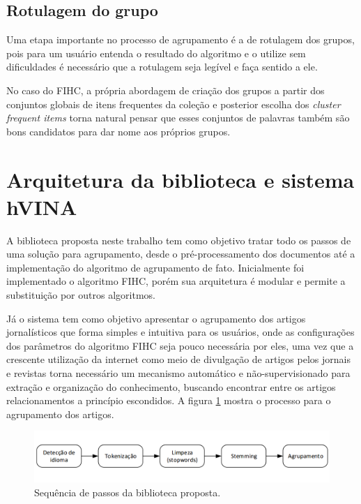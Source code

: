 \documentclass[a4paper,12pt]{article}
\begin{document}
\subsection {Rotulagem do grupo}
\label {sec:rotulagem_grupo}

Uma etapa importante no processo de agrupamento é a de rotulagem dos grupos, pois para um usuário entenda o resultado do algoritmo e o utilize sem dificuldades é necessário que a rotulagem seja legível e faça sentido a ele. 

No caso do FIHC, a própria abordagem de criação dos grupos a partir dos conjuntos globais de itens frequentes da coleção e posterior escolha dos \textit{cluster frequent items} torna natural pensar que esses conjuntos de palavras também são bons candidatos para dar nome aos próprios grupos. 


\newpage

\section {Arquitetura da biblioteca e sistema hVINA}
\label {sec:arquitetura_biblioteca}

A biblioteca proposta neste trabalho tem como objetivo tratar todo os passos de uma solução para agrupamento, desde o pré-processamento dos documentos até a implementação do algoritmo de agrupamento de fato. Inicialmente foi implementado o algoritmo FIHC, porém sua arquitetura é modular e permite a substituição por outros algoritmos.

Já o sistema tem como objetivo apresentar o agrupamento dos artigos jornalísticos que forma simples e intuitiva para os usuários, onde as configurações dos parâmetros do algoritmo FIHC seja pouco necessária por eles, uma vez que a crescente utilização da internet como meio de divulgação de artigos pelos jornais e revistas torna necessário um mecanismo automático e não-supervisionado para extração e organização do conhecimento, buscando encontrar entre os artigos relacionamentos a princípio escondidos. A figura \ref{fig:arquitetura_biblioteca} mostra o processo para o agrupamento dos artigos.

\begin{figure}[h]
    \begin{center}
        \includegraphics[scale=0.35]{arquitetura.png}
    \end{center}
    \caption{Sequência de passos da biblioteca proposta.}
    \label{fig:arquitetura_biblioteca}
\end{figure}
\end{document}

